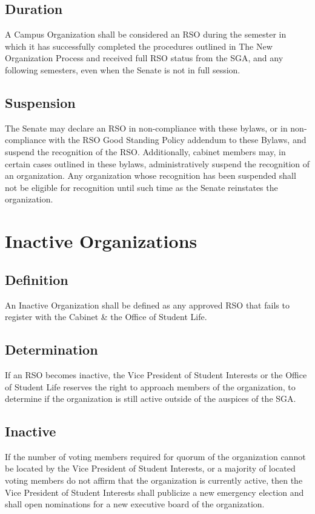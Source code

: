 \documentclass[12pt]{scrreprt}
\begin{document}
\subsection{Duration}
A Campus Organization shall be considered an RSO during the semester in which
it has successfully completed the procedures outlined in The New Organization Process and received full RSO status from the SGA, and any following semesters, even when the Senate is not in full session.

\subsection{Suspension}
The Senate may declare an RSO in non-compliance with these bylaws, or in non-compliance with the RSO Good Standing Policy addendum to these Bylaws, and suspend 
the recognition of the RSO. Additionally, cabinet members may, in certain 
cases outlined in these bylaws, administratively suspend the recognition of an 
organization. Any organization whose recognition has been suspended shall not 
be eligible for recognition until such time as the Senate reinstates the 
organization.

\section{Inactive Organizations}

\subsection{Definition}
An Inactive Organization shall be defined as any approved RSO that fails to 
register with the Cabinet \& the Office of Student Life.

\subsection{Determination}
If an RSO becomes inactive, the Vice President of Student Interests or the Office of Student Life reserves the right to approach members of the organization, to determine if the 
organization is still active outside of the auspices of the SGA.

\subsection{Inactive}
If the number of voting members required for quorum of the organization cannot 
be located by the Vice President of Student Interests, or a majority of located voting members do not affirm that the organization is currently active, then the Vice President of Student Interests shall publicize a new emergency election and shall open nominations for a new executive board of the organization.
\end{document}
